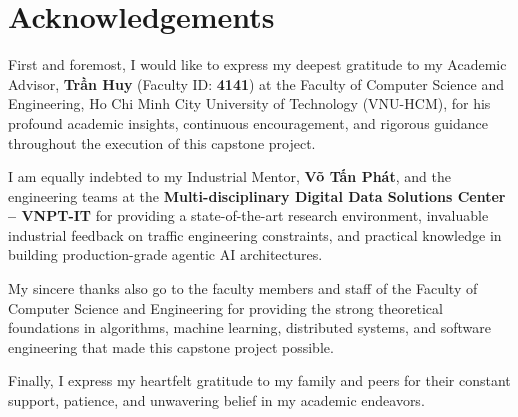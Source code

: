 \chapter*{Acknowledgements}

\noindent First and foremost, I would like to express my deepest gratitude to my Academic Advisor, \textbf{Trần Huy} (Faculty ID: \textbf{4141}) at the Faculty of Computer Science and Engineering, Ho Chi Minh City University of Technology (VNU-HCM), for his profound academic insights, continuous encouragement, and rigorous guidance throughout the execution of this capstone project.

\vspace{0.3cm}
\noindent I am equally indebted to my Industrial Mentor, \textbf{Võ Tấn Phát}, and the engineering teams at the \textbf{Multi-disciplinary Digital Data Solutions Center -- VNPT-IT} for providing a state-of-the-art research environment, invaluable industrial feedback on traffic engineering constraints, and practical knowledge in building production-grade agentic AI architectures.

\vspace{0.3cm}
\noindent My sincere thanks also go to the faculty members and staff of the Faculty of Computer Science and Engineering for providing the strong theoretical foundations in algorithms, machine learning, distributed systems, and software engineering that made this capstone project possible.

\vspace{0.3cm}
\noindent Finally, I express my heartfelt gratitude to my family and peers for their constant support, patience, and unwavering belief in my academic endeavors.
